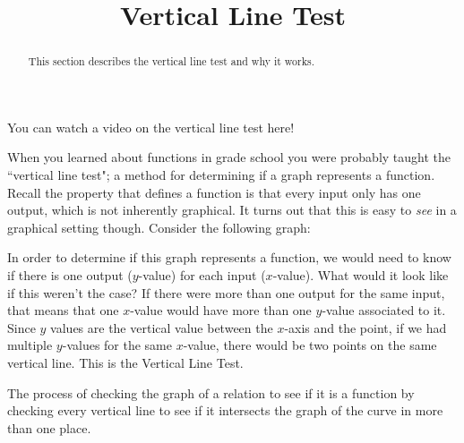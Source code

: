 \documentclass{ximera}
\title{Vertical Line Test}
\begin{document}
\begin{abstract}
This section describes the vertical line test and why it works.
\end{abstract}
\maketitle
 
 
 You can watch a video on the vertical line test here!
 
 
 
When you learned about functions in grade school you were probably taught the ``vertical line test"; a method for determining if a graph represents a function. Recall the property that defines a function is that every input only has one output, which is not inherently graphical. It turns out that this is easy to \textit{see} in a graphical setting though. Consider the following graph:

\begin{center}
\end{center}

In order to determine if this graph represents a function, we would need to know if there is one output ($y$-value) for each input ($x$-value). What would it look like if this weren't the case? If there were more than one output for the same input, that means that one $x$-value would have more than one $y$-value associated to it. Since $y$ values are the vertical value between the $x$-axis and the point, if we had multiple $y$-values for the same $x$-value, there would be two points on the same vertical line. This is the Vertical Line Test.

\begin{definition}
    The process of checking the graph of a relation to see if it is a function by checking every vertical line to see if it intersects the graph of the curve in more than one place. 
\end{definition}
\end{document}
